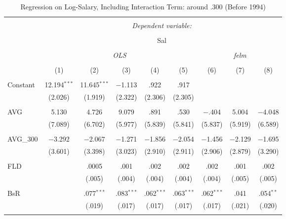 
\begin{table}[H] \centering
  \caption{Regression on Log-Salary, Including Interaction Term: around .300 (Before 1994)} 
  \label{AVG300_B}
\tiny
\begin{tabular}{@{\extracolsep{5pt}}lcccccccc}
\\[-1.8ex]\hline
\hline \\[-1.8ex]
 & \multicolumn{8}{c}{\textit{Dependent variable:}} \\
\cline{2-9}
\\[-1.8ex] & \multicolumn{8}{c}{Sal} \\
\\[-1.8ex] & \multicolumn{5}{c}{\textit{OLS}} & \multicolumn{3}{c}{\textit{felm}} \\
\\[-1.8ex] & (1) & (2) & (3) & (4) & (5) & (6) & (7) & (8)\\
\hline \\[-1.8ex]
 Constant & 12.194$^{***}$ & 11.645$^{***}$ & $-$1.113 & .922 & .917 &  &  &  \\
  & (2.026) & (1.919) & (2.322) & (2.306) & (2.305) &  &  &  \\
  & & & & & & & & \\
 AVG & 5.130 & 4.726 & 9.079 & .891 & .530 & $-$.404 & 5.004 & $-$4.048 \\
  & (7.089) & (6.702) & (5.977) & (5.839) & (5.841) & (5.837) & (5.919) & (6.589) \\
  & & & & & & & & \\
 AVG\_300 & $-$3.292 & $-$2.067 & $-$1.271 & $-$1.856 & $-$2.054 & $-$1.456 & $-$2.129 & $-$1.695 \\
  & (3.601) & (3.398) & (3.023) & (2.910) & (2.911) & (2.906) & (2.879) & (3.290) \\
  & & & & & & & & \\
 FLD &  & .0005 & .001 & .002 & .002 & .002 & .001 & .002 \\
  &  & (.005) & (.004) & (.004) & (.004) & (.004) & (.005) & (.005) \\
  & & & & & & & & \\
 BsR &  & .077$^{***}$ & .083$^{***}$ & .062$^{***}$ & .063$^{***}$ & .062$^{***}$ & .041 & .054$^{**}$ \\
  &  & (.019) & (.017) & (.017) & (.017) & (.017) & (.021) & (.020) \\
  & & & & & & & & \\

\end{tabular}
\end{table}
